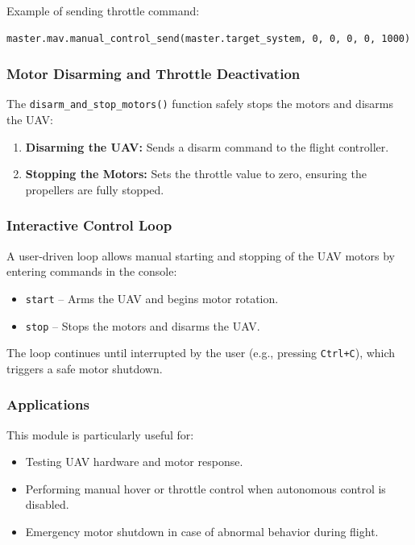 Example of sending throttle command:
\begin{verbatim}
master.mav.manual_control_send(master.target_system, 0, 0, 0, 0, 1000)
\end{verbatim}

\subsubsection{Motor Disarming and Throttle Deactivation}

The \texttt{disarm\_and\_stop\_motors()} function safely stops the motors and disarms the UAV:

\begin{enumerate}
    \item \textbf{Disarming the UAV:} Sends a disarm command to the flight controller.
    \item \textbf{Stopping the Motors:} Sets the throttle value to zero, ensuring the propellers are fully stopped.
\end{enumerate}

\subsubsection{Interactive Control Loop}

A user-driven loop allows manual starting and stopping of the UAV motors by entering commands in the console:

\begin{itemize}
    \item \texttt{start} – Arms the UAV and begins motor rotation.
    \item \texttt{stop} – Stops the motors and disarms the UAV.
\end{itemize}

The loop continues until interrupted by the user (e.g., pressing \texttt{Ctrl+C}), which triggers a safe motor shutdown.

\subsubsection{Applications}

This module is particularly useful for:

\begin{itemize}
    \item Testing UAV hardware and motor response.
    \item Performing manual hover or throttle control when autonomous control is disabled.
    \item Emergency motor shutdown in case of abnormal behavior during flight.
\end{itemize}

